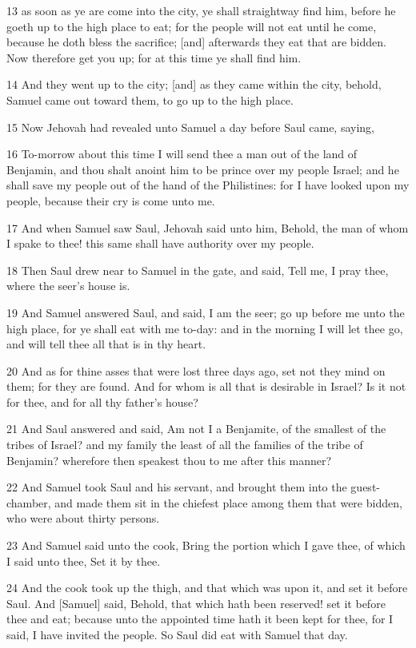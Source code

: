 \par 13 as soon as ye are come into the city, ye shall straightway find him, before he goeth up to the high place to eat; for the people will not eat until he come, because he doth bless the sacrifice; [and] afterwards they eat that are bidden. Now therefore get you up; for at this time ye shall find him.
\par 14 And they went up to the city; [and] as they came within the city, behold, Samuel came out toward them, to go up to the high place.
\par 15 Now Jehovah had revealed unto Samuel a day before Saul came, saying,
\par 16 To-morrow about this time I will send thee a man out of the land of Benjamin, and thou shalt anoint him to be prince over my people Israel; and he shall save my people out of the hand of the Philistines: for I have looked upon my people, because their cry is come unto me.
\par 17 And when Samuel saw Saul, Jehovah said unto him, Behold, the man of whom I spake to thee! this same shall have authority over my people.
\par 18 Then Saul drew near to Samuel in the gate, and said, Tell me, I pray thee, where the seer's house is.
\par 19 And Samuel answered Saul, and said, I am the seer; go up before me unto the high place, for ye shall eat with me to-day: and in the morning I will let thee go, and will tell thee all that is in thy heart.
\par 20 And as for thine asses that were lost three days ago, set not they mind on them; for they are found. And for whom is all that is desirable in Israel? Is it not for thee, and for all thy father's house?
\par 21 And Saul answered and said, Am not I a Benjamite, of the smallest of the tribes of Israel? and my family the least of all the families of the tribe of Benjamin? wherefore then speakest thou to me after this manner?
\par 22 And Samuel took Saul and his servant, and brought them into the guest-chamber, and made them sit in the chiefest place among them that were bidden, who were about thirty persons.
\par 23 And Samuel said unto the cook, Bring the portion which I gave thee, of which I said unto thee, Set it by thee.
\par 24 And the cook took up the thigh, and that which was upon it, and set it before Saul. And [Samuel] said, Behold, that which hath been reserved! set it before thee and eat; because unto the appointed time hath it been kept for thee, for I said, I have invited the people. So Saul did eat with Samuel that day.
